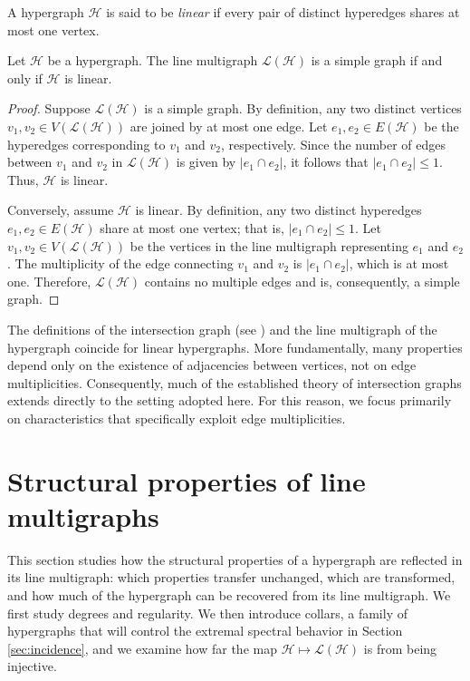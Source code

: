 \documentclass[12pt,reqno]{amsart}
\begin{document}
\begin{definition}
A hypergraph $\mathcal{H}$ is said to be \textit{linear} if every pair of distinct hyperedges shares at most one vertex.
\end{definition}

\begin{lemma}
Let $\mathcal{H}$ be a hypergraph. The line multigraph $\mathcal{L}(\mathcal{H})$ is a simple graph if and only if $\mathcal{H}$ is linear.
\end{lemma}
\begin{proof}
Suppose $\mathcal{L}(\mathcal{H})$ is a simple graph. By definition, any two distinct vertices $v_1, v_2 \in V(\mathcal{L}(\mathcal{H}))$ are joined by at most one edge. Let $e_1, e_2 \in E(\mathcal{H})$ be the hyperedges corresponding to $v_1$ and $v_2$, respectively. Since the number of edges between $v_1$ and $v_2$ in $\mathcal{L}(\mathcal{H})$ is given by $|e_1 \cap e_2|$, it follows that $|e_1 \cap e_2| \leq 1$. Thus, $\mathcal{H}$ is linear.

Conversely, assume $\mathcal{H}$ is linear. By definition, any two distinct hyperedges $e_1, e_2 \in E(\mathcal{H})$ share at most one vertex; that is, $|e_1 \cap e_2| \leq 1$. Let $v_1, v_2 \in V(\mathcal{L}(\mathcal{H}))$ be the vertices in the line multigraph representing $e_1$ and $e_2$. The multiplicity of the edge connecting $v_1$ and $v_2$ is $|e_1 \cap e_2|$, which is at most one. Therefore, $\mathcal{L}(\mathcal{H})$ contains no multiple edges and is, consequently, a simple graph.
\end{proof}

The definitions of the intersection graph (see \cite{line}) and the line multigraph of the hypergraph coincide for linear hypergraphs. More fundamentally, many properties depend only on the existence of adjacencies between vertices, not on edge multiplicities. Consequently, much of the established theory of intersection graphs extends directly to the setting adopted here. For this reason, we focus primarily on characteristics that specifically exploit edge multiplicities.

\section{Structural properties of line multigraphs}\label{sec:structural}

This section studies how the structural properties of a hypergraph are reflected in its line multigraph: which properties transfer unchanged, which are transformed, and how much of the hypergraph can be recovered from its line multigraph. We first study degrees and regularity. We then introduce collars, a family of hypergraphs that will control the extremal spectral behavior in Section \ref{sec:incidence}, and we examine how far the map $\mathcal{H} \mapsto \mathcal{L}(\mathcal{H})$ is from being injective.
\end{document}
